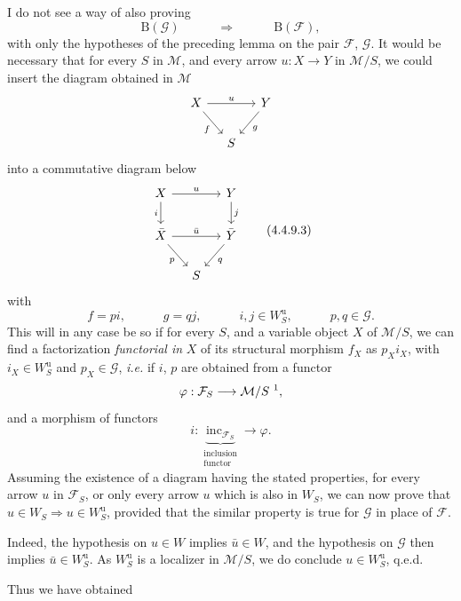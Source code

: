 \documentclass[11pt]{article}
\newcommand{\printedpage}[1]{\marginpar{\footnotesize p.~#1}}
\newcommand{\msp}[1]{\marginpar{\footnotesize [#1]}}
\newcommand{\inc}{\mathrm{inc}}
\begin{document}
I do not see a way of also proving
\[
\mathrm{B}(\mathcal{G}) \qquad\quad \Longrightarrow \qquad\quad \mathrm{B}(\mathcal{F}),
\]
with only the hypotheses of the preceding lemma on the pair $\mathcal{F}$, $\mathcal{G}$. It would be necessary that for every $S$ in $\mathcal{M}$, and every arrow
\msp{page 53}
$u : X \longrightarrow Y$ in $\mathcal{M}/S$, we could insert the diagram obtained in $\mathcal{M}$
\[
\begin{tikzcd}[column sep=small]
X \arrow[rr, "u"] \arrow[dr, "f"'] & & Y \arrow[dl, "g"] \\
& S &
\end{tikzcd}
\]
\printedpage{31}
into a commutative diagram below
\[
\begin{tikzcd}[column sep=small]
X \arrow[rr, "u"] \arrow[d, "i"'] & & Y \arrow[d, "j"] \\
\bar{X} \arrow[rr, "\bar{u}"] \arrow[dr, "p"'] & & \bar{Y} \arrow[dl, "q"] \\
& S &
\end{tikzcd}
\tag*{(4.4.9.3)}
\]
with
\[
f = pi, \qquad\quad g = qj, \qquad\quad i, j \in W^{\mathrm{u}}_S, \qquad\quad p, q \in \mathcal{G}.
\]
This will in any case be so if for every $S$, and a variable object $X$ of $\mathcal{M}/S$, we can find a factorization \textit{functorial in} $X$ of its structural morphism $f_X$ as $p_X i_X$, with $i_X \in W^{\mathrm{u}}_S$ and $p_X \in \mathcal{G}$, \textit{i.e.} if $i$, $p$ are obtained from a functor
\[
\varphi : \mathcal{F}_S \longrightarrow \mathcal{M}/S \ \text{\footnotemark},
\]
and a morphism of functors
\[
i : \underbrace{\inc_{\mathcal{F}_S}}_{\substack{\text{inclusion}\\ \text{functor}}} \longrightarrow \varphi.
\]
Assuming the existence of a diagram having the stated properties, for every arrow $u$ in $\mathcal{F}_S$, or only every arrow $u$ which is also in $W_S$, we can now prove that $u \in W_S \Longrightarrow u \in W^{\mathrm{u}}_S$, provided that the similar property is true for $\mathcal{G}$ in place of $\mathcal{F}$.

\msp{page 54}
Indeed, the hypothesis on $u \in W$ implies $\bar{u} \in W$, and the hypothesis on $\mathcal{G}$ then implies $\bar{u} \in W^{\mathrm{u}}_S$. As $W^{\mathrm{u}}_S$ is a localizer in $\mathcal{M}/S$, we do conclude $u \in W^{\mathrm{u}}_S$, q.e.d.

Thus we have obtained
\end{document}
